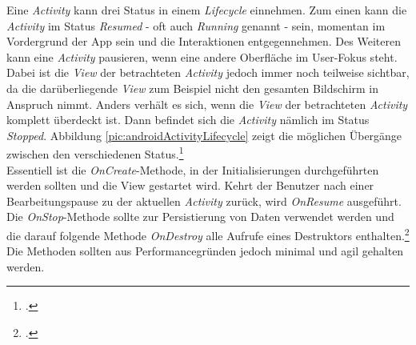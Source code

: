 Eine \textit{Activity} kann drei Status in einem \textit{Lifecycle} einnehmen. Zum einen kann die \textit{Activity} im Status \textit{Resumed} - oft auch \textit{Running} genannt - sein, momentan im Vordergrund der App sein und die Interaktionen entgegennehmen. Des Weiteren kann eine \textit{Activity} pausieren, wenn eine andere Oberfläche im User-Fokus steht. Dabei ist die \textit{View} der betrachteten \textit{Activity} jedoch immer noch teilweise sichtbar, da die darüberliegende \textit{View} zum Beispiel nicht den gesamten Bildschirm in Anspruch nimmt. Anders verhält es sich, wenn die \textit{View} der betrachteten \textit{Activity} komplett überdeckt ist. Dann befindet sich die \textit{Activity} nämlich im Status \textit{Stopped}. Abbildung \ref{pic:androidActivityLifecycle} zeigt die möglichen Übergänge zwischen den verschiedenen Status.\footcite{Android-Activities}\\
Essentiell ist die \textit{OnCreate}-Methode, in der Initialisierungen durchgeführten werden sollten und die View gestartet wird. Kehrt der Benutzer nach einer Bearbeitungspause zu der aktuellen \textit{Activity} zurück, wird \textit{OnResume} ausgeführt.\\
Die \textit{OnStop}-Methode sollte zur Persistierung von Daten verwendet werden und die darauf folgende Methode \textit{OnDestroy} alle Aufrufe eines Destruktors enthalten.\footcite[S. 289]{Android-BeckerPant}\\
Die Methoden sollten aus Performancegründen jedoch minimal und agil gehalten werden.
